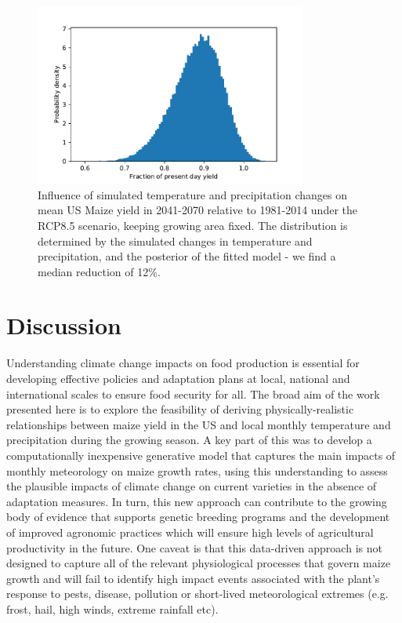 \documentclass[12pt]{iopart}
\begin{document}
\begin{figure}
\centering
\includegraphics[width=0.8\textwidth]{./figures/simulated_impact}
\caption{\label{fig:simulated_impact} Influence of simulated temperature and precipitation changes \citep[][]{ipcc2:2013} on mean US Maize yield in 2041-2070 relative to 1981-2014 under the RCP8.5 scenario, keeping growing area fixed. The distribution is determined by the simulated changes in temperature and precipitation, and the posterior of the fitted model - we find a median reduction of 12\%. }
\end{figure}

\section{Discussion}
\label{sec:future}
Understanding climate change impacts on food production is essential for developing effective policies and adaptation plans at local, national and international scales to ensure food security for all. The broad aim of the work presented here is to explore the feasibility of deriving physically-realistic relationships between maize yield in the US and local monthly temperature and precipitation during the growing season. A key part of this was to develop a computationally inexpensive generative model that captures the main impacts of monthly meteorology on maize growth rates, using this understanding to assess the plausible impacts of climate change on current varieties in the absence of adaptation measures. In turn, this new approach can contribute to the growing body of evidence that supports genetic breeding programs and the development of improved agronomic practices which will ensure high levels of agricultural productivity in the future. One caveat is that this data-driven approach is not designed to capture all of the relevant physiological processes that govern maize growth and will fail to identify high impact events associated with the plant's response to pests, disease, pollution or short-lived meteorological extremes (e.g. frost, hail, high winds, extreme rainfall etc).
\end{document}
